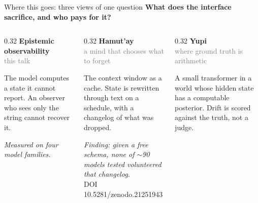 \documentclass[aspectratio=169,10pt]{beamer}
\begin{document}
\begin{frame}{Where this goes: three views of one question}
  \textbf{What does the interface sacrifice, and who pays for it?}
  \vspace{0.5em}
  \begin{columns}[T]
    \begin{column}{0.32\textwidth}
      \textbf{Epistemic observability}\\
      \textcolor{gray}{\small this talk}
      \vspace{0.2em}

      \small The model computes a state it cannot report. An observer who
      sees only the string cannot recover it.

      \vspace{0.2em}
      \small\textit{Measured on four model families.}
    \end{column}
    \begin{column}{0.32\textwidth}
      \textbf{Hamut'ay}\\
      \textcolor{gray}{\small a mind that chooses what to forget}
      \vspace{0.2em}

      \small The context window as a cache. State is rewritten through text
      on a schedule, with a changelog of what was dropped.

      \vspace{0.2em}
      \small\textit{Finding: given a free schema, none of $\sim$90 models tested volunteered that changelog.}\\
      \scriptsize DOI 10.5281/zenodo.21251943
    \end{column}
    \begin{column}{0.32\textwidth}
      \textbf{Yupi}\\
      \textcolor{gray}{\small where ground truth is arithmetic}
      \vspace{0.2em}

      \small A small transformer in a world whose hidden state has a
      computable posterior. Drift is scored against the truth, not a judge.


\end{column}
\end{columns}
\end{frame}
\end{document}
